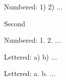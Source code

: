 \begin{SMNumItemize}
	\item Numbered: 1) 2) ...
	\item Second
\end{SMNumItemize}
\begin{SMNumPeriodItemize}
	\item Numbered: 1. 2. ...
\end{SMNumPeriodItemize}
\begin{SMAlphaItemize}
	\item Lettered: a) b) ...
\end{SMAlphaItemize}
\begin{SMAlphaPeriodItemize}
	\item Lettered: a. b. ...
\end{SMAlphaPeriodItemize}

